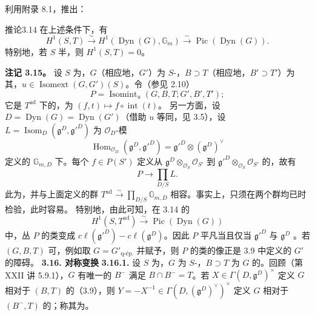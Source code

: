 利用附录 8.1，推出：
\begin{SGAresult}{推论}{3.14}
在上述条件下，有
\[H^1(S,T)\xrightarrow\sim H^1(\operatorname{Dyn}(G),\mathbb G_m)\xrightarrow\sim\operatorname{Pic}(\operatorname{Dyn}(G)).\]
特别地，若 $S$ 半，则 $H^1(S,T)=0$。
\end{SGAresult}
\textbf{注记 3.15。} 设 $S$ 为，$G$（相应地，$G'$）为 $S$-，$B\supset T$（相应地，$B'\supset T'$）为其，$u\in\operatorname{Isomext}(G,G')(S)$。令（参见 2.10）
\[P=\operatorname{Isomint}_u(G,B,T;G',B',T');\]
它是 $T^{\mathrm{ad}}$ 下的，为 $(f,t)\mapsto f\circ\operatorname{int}(t)$。
另一方面，设 $D=\operatorname{Dyn}(G)=\operatorname{Dyn}(G')$（借助 $u$ 等同，见 3.5），设 $L=\operatorname{Isom}_D(\mathfrak g^D,\mathfrak g'^D)$ 为 $\mathcal O_D$-模
\[\operatorname{Hom}_{\mathcal O_D}(\mathfrak g^D,\mathfrak g'^D)=\mathfrak g'^D\otimes(\mathfrak g^D)^\vee\]
定义的 $\mathbb G_{m,D}$ 下。每个 $f\in P(S')$ 定义从 $\mathfrak g^D\otimes_{\mathcal O_S}\mathcal O_{S'}$ 到 $\mathfrak g'^D\otimes_{\mathcal O_S}\mathcal O_{S'}$ 的，故有
\[P\longrightarrow\prod_{D/S}L.\]
此为，并与上面定义的群 $T^{\mathrm{ad}}\xrightarrow\sim\prod_{D/S}\mathbb G_{m,D}$ 相容。事实上，只须在两个群均已时检验，此时容易。
特别地，由此可知，在 3.14 的
\[H^1(S,T^{\mathrm{ad}})\xrightarrow\sim\operatorname{Pic}(\operatorname{Dyn}(G))\]
中，丛 $P$ 的类变成 $c\ell(\mathfrak g'^D)-c\ell(\mathfrak g^D)$。因此 $P$ 平凡当且仅当 $\mathfrak g'^D$ 与 $\mathfrak g^D$ 。若 $(G,B,T)$ 可，例如取 $G=G'_{\mathrm{q\text{-}ép.}}$ 并赋予，则 $P$ 的类的像正是 3.9 中定义的 $G'$ 的障碍。
\textbf{3.16. 对称变换}
\textbf{3.16.1.} 设 $S$ 为，$G$ 为 $S$-，$B\supset T$ 为 $G$ 的。回顾（第 XXII 讲 5.9.1），$G$ 有唯一的  $B^-$ 满足 $B\cap B^-=T$。若 $X\in\Gamma(D,\mathfrak g^D)^\times$ 定义 $G$ 相对于 $(B,T)$ 的（3.9），则 $Y=-X^{-1}\in\Gamma(D,(\mathfrak g^D)^\vee)^\times$ 定义 $G$ 相对于 $(B^-,T)$ 的；称其为。
